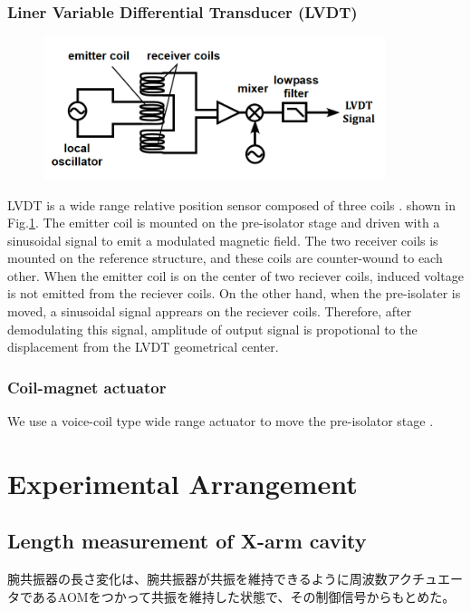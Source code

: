 \subsubsection{Liner Variable Differential Transducer (LVDT)}
\begin{figure}[h]
  \begin{center}   
    \includegraphics[width=10cm]{./img_chap6/img605.png}
    \caption{\cite{sekiguchi2016astudy}}\label{img:img605}
  \end{center}
\end{figure}
LVDT is a wide range relative position sensor composed of three coils \cite{Tariq2002hh}. shown in Fig.\ref{img:img605}. The emitter coil is mounted on the pre-isolator stage and driven with a sinusoidal signal to emit a modulated magnetic field. The two receiver coils is mounted on the reference structure, and these coils are counter-wound to each other. When the emitter coil is on the center of two reciever coils, induced voltage is not emitted from the reciever coils. On the other hand, when the pre-isolater is moved, a sinusoidal signal apprears on the reciever coils. Therefore, after demodulating this signal, amplitude of output signal is propotional to the displacement from the LVDT geometrical center.

\subsubsection{Coil-magnet actuator}
We use a voice-coil type wide range actuator to move the pre-isolator stage \cite{wang2002constant}.

\section{Experimental Arrangement}
\subsection{Length measurement of X-arm cavity}
腕共振器の長さ変化は、腕共振器が共振を維持できるように周波数アクチュエータであるAOMをつかって共振を維持した状態で、その制御信号からもとめた。



